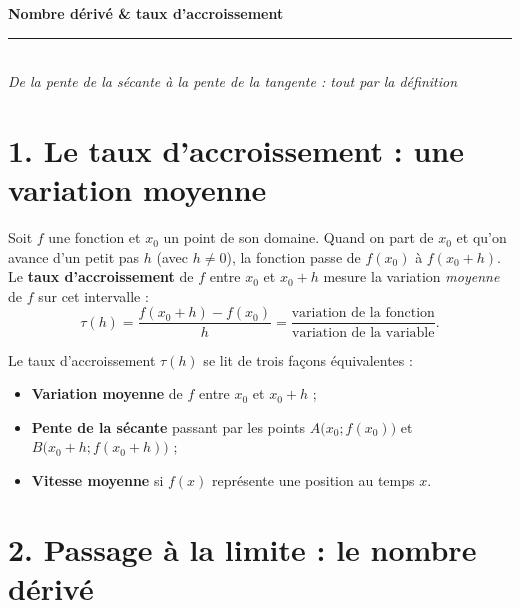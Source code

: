 \pagestyle{fancy}\fancyhf{}
\fancyfoot[C]{\small\thepage}
\renewcommand{\headrulewidth}{0.8pt}



\begin{center}
{\LARGE\bfseries\color{primarydark} Nombre dérivé \& taux d'accroissement}\\[2pt]
{\color{primary}\rule{0.5\textwidth}{1.2pt}}\\[4pt]
{\small\itshape De la pente de la sécante à la pente de la tangente : tout par la définition}
\end{center}
\vspace{2mm}

\section*{1. Le taux d'accroissement : une variation moyenne}

Soit $f$ une fonction et $x_0$ un point de son domaine. Quand on part de $x_0$ et qu'on
avance d'un petit pas $h$ (avec $h\neq 0$), la fonction passe de $f(x_0)$ à $f(x_0+h)$.
Le \textbf{taux d'accroissement} de $f$ entre $x_0$ et $x_0+h$ mesure la variation
\emph{moyenne} de $f$ sur cet intervalle :
\[
\tau(h)=\frac{f(x_0+h)-f(x_0)}{h}
=\frac{\text{variation de la fonction}}{\text{variation de la variable}}.
\]

\begin{cle}
Le taux d'accroissement $\tau(h)$ se lit de trois façons équivalentes :
\begin{itemize}[leftmargin=6mm,itemsep=1pt]
  \item \textbf{Variation moyenne} de $f$ entre $x_0$ et $x_0+h$ ;
  \item \textbf{Pente de la sécante} passant par les points $A\big(x_0;f(x_0)\big)$ et
        $B\big(x_0+h;f(x_0+h)\big)$ ;
  \item \textbf{Vitesse moyenne} si $f(x)$ représente une position au temps $x$.
\end{itemize}
\end{cle}

\section*{2. Passage à la limite : le nombre dérivé}

